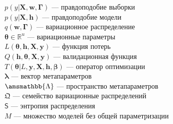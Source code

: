 $p(y|\mathbf{X}, \mathbf{w}, \boldsymbol{\Gamma})$ --- правдоподобие выборки\\
$p(y|\mathbf{X}, \mathbf{h})$ --- правдоподобие модели\\
$q(\mathbf{w}, \boldsymbol{\Gamma})$ --- вариационное распределение\\
$\boldsymbol{\theta} \in \mathbb{R}^u$ --- вариационные параметры\\
$L(\boldsymbol{\theta}, \mathbf{h}, \mathbf{X}, \mathbf{y})$ --- функция потерь\\
$Q(\mathbf{h}, \boldsymbol{\theta},  \mathbf{X}, \mathbf{y})$ --- валидационная функция\\
$T(\boldsymbol{\theta}| L, \mathbf{y}, \mathbf{X},  \mathbf{h}, \boldsymbol{\beta})$ --- оператор оптимизации\\
$\boldsymbol{\lambda}$ --- вектор метапараметров\\
$\amsmathbb{\Lambda}$ --- пространство метапараметров\\
$\mathfrak{Q}$ --- семейство вариационные распределений\\
$\mathsf{S}$ --- энтропия распределения\\
$M$ --- множество моделей без общей параметризации\\
